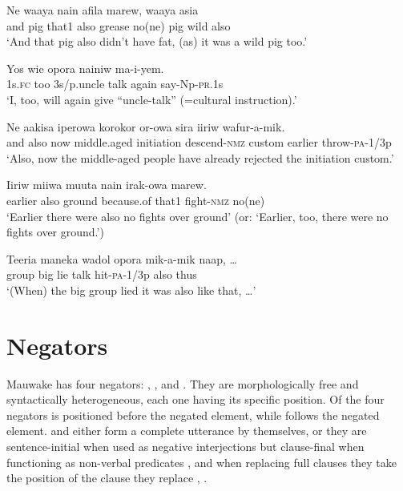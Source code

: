 \ea%
\label{ex:3:x749}
\gll Ne waaya nain  afila marew, waaya asia  \\
and pig that1 also grease no(ne) pig wild also\\
\glt`And that pig also didn't have fat, (as) it was a wild pig too.'
\z

\ea%
\label{ex:3:x1937}
\gll Yos  wie opora nainiw ma-i-yem. \\
1s.\textsc{fc} too 3s/p.uncle talk again say-Np-\textsc{pr}.1s\\
\glt`I, too, will again give ``uncle-talk'' (=cultural instruction).'
\z

\ea%
\label{ex:3:x750}
\gll Ne  aakisa iperowa korokor or-owa sira iiriw wafur-a-mik.\\
and also now middle.aged initiation descend-\textsc{nmz} custom earlier throw-\textsc{pa}-1/3p\\
\glt`Also, now the middle-aged people have already rejected the initiation custom.'
\z

\ea%
\label{ex:3:x751}
\gll Iiriw  miiwa muuta nain irak-owa marew. \\
earlier also ground because.of that1 fight-\textsc{nmz} no(ne)\\
\glt`Earlier there were also no fights over ground' (or: `Earlier, too, there were no fights over ground.')
\z

\ea%
\label{ex:3:x808}
\gll Teeria maneka wadol opora mik-a-mik  naap, {\dots} \\
group big lie talk hit-\textsc{pa}-1/3p also thus\\
\glt`(When) the big group lied it was also like that, {\dots}'
\z

\section{Negators} \label{sec:3:10}
{}
Mauwake has four negators: , ,  and . They are morphologically free and syntactically heterogeneous, each one having its specific position. Of the four negators  is positioned before the negated element, while  follows the negated element.  and  either form a complete utterance by themselves, or they are sentence-initial when used as negative interjections  but clause-final when functioning as non-verbal predicates , and when replacing full clauses they take the position of the clause they replace , . 

